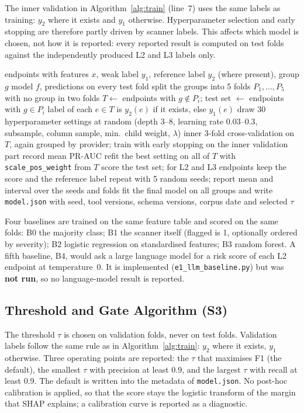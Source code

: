 \documentclass[conference]{IEEEtran}
\begin{document}
The inner validation in Algorithm~\ref{alg:train} (line~7) uses the same labels as training:
$y_2$ where it exists and $y_1$ otherwise. Hyperparameter selection and early stopping are
therefore partly driven by scanner labels. This affects which model is chosen, not how it is
reported: every reported result is computed on test folds against the independently produced L2 and L3 labels only.

\begin{algorithm}[!t]
\caption{Grouped training and tuning (T4)}
\label{alg:train}
\footnotesize
\begin{algorithmic}[1]
\REQUIRE endpoints with features $x$, weak label $y_1$, reference label $y_2$ (where present), group $g$
\ENSURE model $f$, predictions on every test fold
\STATE split the groups into 5 folds $P_1,\dots,P_5$ with no group in two folds
  \STATE $T\leftarrow$ endpoints with $g\notin P_i$;\; test set $\leftarrow$ endpoints with $g\in P_i$
  \STATE label of each $e\in T$ is $y_2(e)$ if it exists, else $y_1(e)$
  \STATE draw 30 hyperparameter settings at random (depth 3--8, learning rate 0.03--0.3, subsample, column sample, min.\ child weight, $\lambda$)
    \STATE inner 3-fold cross-validation on $T$, again grouped by provider; train with early stopping on the inner validation part
    \STATE record mean PR-AUC
  \ENDFOR
  \STATE refit the best setting on all of $T$ with \texttt{scale\_pos\_weight} from $T$
  \STATE score the test set; for L2 and L3 endpoints keep the score and the reference label
\ENDFOR
\STATE repeat with 5 random seeds; report mean and interval over the seeds and folds
\STATE fit the final model on all groups and write \texttt{model.json} with seed, tool versions, schema versions, corpus date and selected $\tau$
\end{algorithmic}
\end{algorithm}

Four baselines are trained on the same feature table and scored on the same folds:
B0 the majority class; B1 the scanner itself (flagged is 1, optionally ordered by severity);
B2 logistic regression on standardised features; B3 random forest. A fifth baseline, B4, would ask a large language model for a risk score of each L2 endpoint at temperature~0. It is implemented (\texttt{e1\_llm\_baseline.py}) but was \textbf{not run}, so no language-model result is reported.

\subsection{Threshold and Gate Algorithm (S3)}
\label{sec:m-gate}
The threshold $\tau$ is chosen on validation folds, never on test folds. Validation labels
follow the same rule as in Algorithm~\ref{alg:train}: $y_2$ where it exists, $y_1$ otherwise.
Three operating points are reported: the $\tau$ that maximises F1 (the default), the smallest
$\tau$ with precision at least 0.9, and the largest $\tau$ with recall at least 0.9. The
default is written into the metadata of \texttt{model.json}. No post-hoc
calibration is applied, so that the score stays the logistic transform of the margin that SHAP
explains; a calibration curve is reported as a diagnostic.
\end{document}
